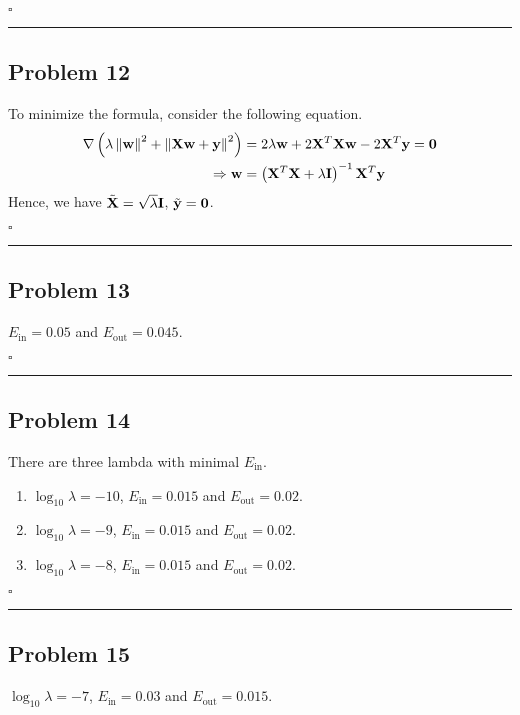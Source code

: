 \documentclass[12pt]{article}
\newcommand*{\QEDB}{\hfill\ensuremath{\square}}
\newcommand{\ParTh}[1]{\left(#1\right)}
\newcommand{\BF}[1]{{\bf#1}}
\newcommand{\VecAbsVal}[1]{\left\|#1\right\|}
\newcommand{\horrule}[1]{\rule{\linewidth}{#1}}
\begin{document}
\QEDB

\horrule{0.5pt}

\subsection*{Problem 12}

To minimize the formula, consider the following equation.
\begin{align}
\nabla\ParTh{\lambda\VecAbsVal{\BF{w}}^2+\VecAbsVal{\BF{X}\BF{w}+\BF{y}}^2}&=2\lambda\BF{w}+2\BF{X}^T\BF{X}\BF{w}-2\BF{X}^T\BF{y}=\BF{0}\\
\Rightarrow\BF{w}&=\ParTh{\BF{X}^T\BF{X}+\lambda\BF{I}}^{-1}\BF{X}^T\BF{y}
\end{align}
Hence, we have $\tilde{\BF{X}}=\sqrt{\lambda}\BF{I}$, $\tilde{\BF{y}}=\BF{0}$.

\QEDB

\horrule{0.5pt}

\subsection*{Problem 13}

$E_{\text{in}}=0.05$ and $E_{\text{out}}=0.045$.

\QEDB

\horrule{0.5pt}

\subsection*{Problem 14}

There are three lambda with minimal $E_{\text{in}}$.
\begin{enumerate}
	\item $\log_{10}\lambda=-10$, $E_{\text{in}}=0.015$ and $E_{\text{out}}=0.02$.
	\item $\log_{10}\lambda=-9$, $E_{\text{in}}=0.015$ and $E_{\text{out}}=0.02$.
	\item $\log_{10}\lambda=-8$, $E_{\text{in}}=0.015$ and $E_{\text{out}}=0.02$.
\end{enumerate}

\QEDB

\horrule{0.5pt}

\subsection*{Problem 15}

$\log_{10}\lambda=-7$, $E_{\text{in}}=0.03$ and $E_{\text{out}}=0.015$.
\end{document}
